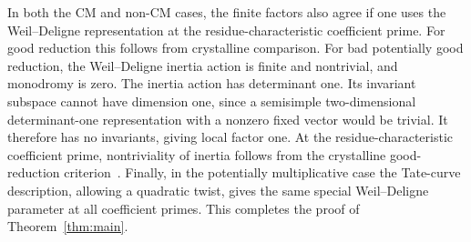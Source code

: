 In both the CM and non-CM cases, the finite factors also agree if one uses the
Weil--Deligne representation at the residue-characteristic coefficient
prime. For good reduction this follows from crystalline comparison. For
bad potentially good reduction, the Weil--Deligne inertia action is finite
and nontrivial, and monodromy is zero. The inertia action has determinant
one. Its invariant subspace cannot have dimension one, since a
semisimple two-dimensional determinant-one representation with a
nonzero fixed vector would be trivial. It therefore has no invariants, giving
local factor one. At the residue-characteristic coefficient prime,
nontriviality of inertia follows from the crystalline good-reduction
criterion~\cite{ColemanIovita}. Finally, in the potentially multiplicative
case the Tate-curve description, allowing a quadratic twist, gives the
same special Weil--Deligne parameter at all coefficient primes. This
completes the proof of Theorem~\ref{thm:main}.
